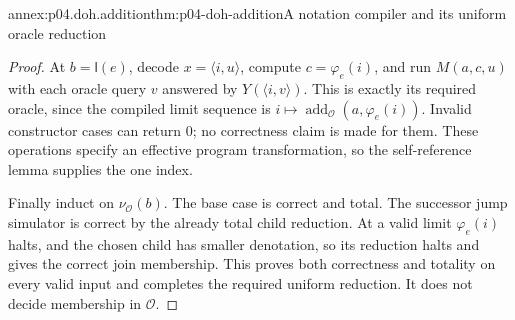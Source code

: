 \begin{annexitem}{annex:p04.doh.addition}{thm:p04-doh-addition}{A notation compiler and its uniform oracle reduction}
\begin{proof}
At \(b=\mathsf l(e)\), decode \(x=\langle i,u\rangle\), compute
\(c=\varphi_e(i)\), and run \(M(a,c,u)\) with each oracle query
\(v\) answered by \(Y(\langle i,v\rangle)\). This is exactly its
required oracle, since the compiled limit sequence is
\(i\mapsto\operatorname{add}_{\mathcal O}(a,\varphi_e(i))\).
Invalid constructor cases can return \(0\); no correctness claim
is made for them. These operations specify an effective program
transformation, so the self-reference lemma supplies the one index.

Finally induct on \(\nu_{\mathcal O}(b)\). The base case is correct
and total. The successor jump simulator is correct by the already
total child reduction. At a valid limit \(\varphi_e(i)\) halts,
and the chosen child has smaller denotation, so its reduction halts
and gives the correct join membership. This proves both correctness
and totality on every valid input and completes the required uniform
reduction. It does not decide membership in \(\mathcal O\).
\end{proof}
\end{annexitem}


